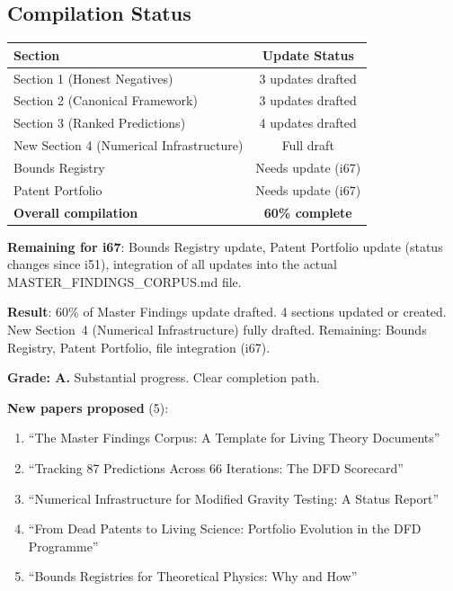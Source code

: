 \documentclass[11pt,a4paper]{article}
\begin{document}
\subsection{Compilation Status}

\begin{center}
\begin{tabular}{lc}
\toprule
\textbf{Section} & \textbf{Update Status} \\
\midrule
Section 1 (Honest Negatives) & 3 updates drafted \\
Section 2 (Canonical Framework) & 3 updates drafted \\
Section 3 (Ranked Predictions) & 4 updates drafted \\
New Section 4 (Numerical Infrastructure) & Full draft \\
Bounds Registry & Needs update (i67) \\
Patent Portfolio & Needs update (i67) \\
\midrule
\textbf{Overall compilation} & \textbf{60\% complete} \\
\bottomrule
\end{tabular}
\end{center}

\textbf{Remaining for i67}: Bounds Registry update, Patent Portfolio update (status changes since i51), integration of all updates into the actual MASTER\_FINDINGS\_CORPUS.md file.

\begin{tcolorbox}[colback=green!5!white, colframe=green!60!black, title={Agent 19: Master Findings Compilation Part 2 COMPLETE}]
\textbf{Result}: 60\% of Master Findings update drafted. 4 sections updated or created. New Section~4 (Numerical Infrastructure) fully drafted. Remaining: Bounds Registry, Patent Portfolio, file integration (i67).

\textbf{Grade: A.} Substantial progress. Clear completion path.

\textbf{New papers proposed} (5):
\begin{enumerate}
\item ``The Master Findings Corpus: A Template for Living Theory Documents''
\item ``Tracking 87 Predictions Across 66 Iterations: The DFD Scorecard''
\item ``Numerical Infrastructure for Modified Gravity Testing: A Status Report''
\item ``From Dead Patents to Living Science: Portfolio Evolution in the DFD Programme''
\item ``Bounds Registries for Theoretical Physics: Why and How''
\end{enumerate}
\end{tcolorbox}
\end{document}
